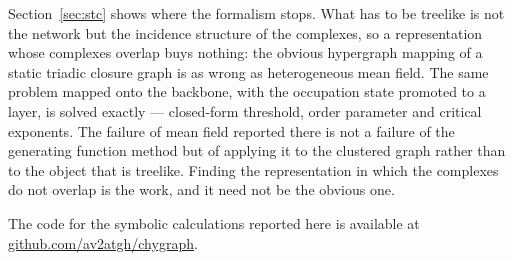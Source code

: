 \documentclass[aps,pre,twocolumn,superscriptaddress,floatfix,longbibliography]{revtex4-2}
\begin{document}
Section~\ref{sec:stc} shows where the formalism stops. What has to be treelike
is not the network but the incidence structure of the complexes, so a
representation whose complexes overlap buys nothing: the obvious hypergraph
mapping of a static triadic closure graph is as wrong as heterogeneous mean
field. The same problem mapped onto the backbone, with the occupation state
promoted to a layer, is solved exactly --- closed-form threshold, order parameter
and critical exponents. The failure of mean field reported there
\cite{cirigliano2025} is not a failure of the generating function method but of
applying it to the clustered graph rather than to the object that is treelike.
Finding the representation in which the complexes do not overlap is the work,
and it need not be the obvious one.

The code for the symbolic calculations reported here is available at
\href{https://github.com/av2atgh/chygraph}{github.com/av2atgh/chygraph}.
\end{document}
